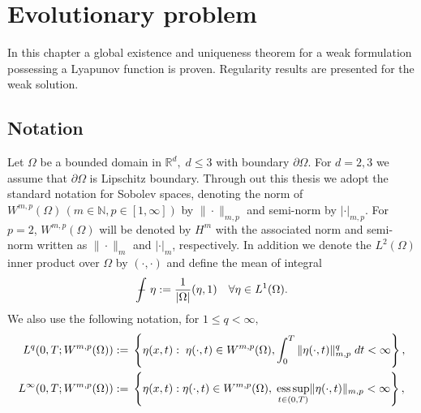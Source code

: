 \chapter{Evolutionary problem}
In this
chapter  a global existence and uniqueness theorem for a weak formulation
possessing a Lyapunov function is proven.  Regularity results are
presented for the weak solution.

\setcounter{equation}{0}
\section{Notation}
Let $\Omega$ be a bounded domain in $\mathbb{R}^d,\; d\leq3$ with
boundary $\partial\Omega$. For
$d=2,3$ we assume that $\partial\Omega$ is Lipschitz boundary. 
Through out this thesis we adopt the standard notation for
Sobolev spaces, denoting the norm of $W^{m,p}(\Omega)\, (m \in
{\mathbb N}, p \in [1,\infty])$ by $\|\cdot\|_{m,p}$ and semi-norm by
$|\cdot|_{m,p}.$   For $p=2$,  $W^{m,p}(\Omega)$ will be denoted by
$H^m$ with the associated norm and semi-norm written as 
$\|\cdot\|_{m}$ and $|\cdot|_{m}$, respectively. In addition we denote the
$L^2(\Omega)$ inner product over $\Omega$ by $(\cdot,\cdot)$ and
define the mean of integral
\[\int\!\!\!\!\!\!{\rm-}\  \eta := \frac{1}{|\Omega|}(\eta,1)\quad \forall\eta \in L^1(\Omega).\]
We also use the following notation, for $1 \leq q < \infty,$
\begin{align*}
L^{q}(0,T;W^{m,p}(\Omega)):=& \; \left\{ \eta(x,t):\;  \eta(\cdot,t) \in W^{m,p}(\Omega), \int_0^T  \|\eta(\cdot,t)\|_{m,p}^q\; dt < \infty\right \},\\
L^{\infty}(0,T;W^{m,p}(\Omega)):=& \; \left\{ \eta(x,t):
\eta(\cdot,t) \in W^{m,p}(\Omega)
,\; \displaystyle{\operatornamewithlimits{ess\,sup}_{t\in (0,T)}} \|\eta(\cdot,t)\|_{m,p} < \infty\right \},
\end{align*}

